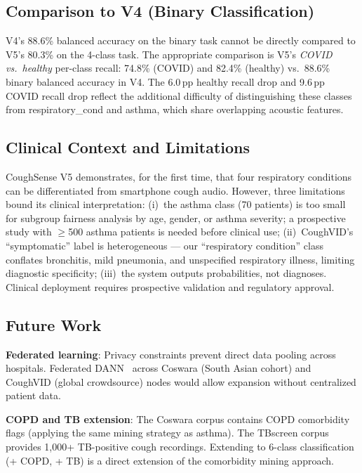 \documentclass[journal]{IEEEtran}
\begin{document}
\subsection{Comparison to V4 (Binary Classification)}

V4's 88.6\% balanced accuracy on the binary task cannot be directly
compared to V5's 80.3\% on the 4-class task. The appropriate comparison
is V5's \textit{COVID vs.\ healthy} per-class recall: 74.8\% (COVID)
and 82.4\% (healthy) vs.\ 88.6\% binary balanced accuracy in V4.
The 6.0\,pp healthy recall drop and 9.6\,pp COVID recall drop reflect
the additional difficulty of distinguishing these classes from
respiratory\_cond and asthma, which share overlapping acoustic features.

\subsection{Clinical Context and Limitations}

CoughSense V5 demonstrates, for the first time, that four respiratory
conditions can be differentiated from smartphone cough audio.
However, three limitations bound its clinical interpretation:
(i)~the asthma class (70 patients) is too small for subgroup
fairness analysis by age, gender, or asthma severity; a prospective
study with $\geq$500 asthma patients is needed before clinical use;
(ii)~CoughVID's ``symptomatic'' label is heterogeneous — our
``respiratory condition'' class conflates bronchitis, mild pneumonia,
and unspecified respiratory illness, limiting diagnostic specificity;
(iii)~the system outputs probabilities, not diagnoses. Clinical
deployment requires prospective validation and regulatory approval.

\subsection{Future Work}

\textbf{Federated learning}: Privacy constraints prevent direct data
pooling across hospitals. Federated DANN~\cite{ganin2016} across
Coswara (South Asian cohort) and CoughVID (global crowdsource) nodes
would allow expansion without centralized patient data.

\textbf{COPD and TB extension}: The Coswara corpus contains COPD
comorbidity flags (applying the same mining strategy as asthma).
The TBscreen corpus~\cite{tbscreen} provides 1,000+ TB-positive
cough recordings. Extending to 6-class classification (+ COPD, + TB)
is a direct extension of the comorbidity mining approach.
\end{document}
